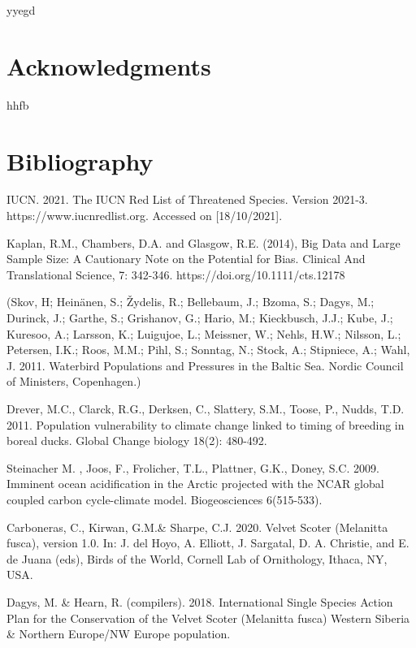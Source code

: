 \documentclass[12pt,a4paper]{article}
\begin{document}
yyegd

\newpage
\section{Acknowledgments}
hhfb




\newpage
\section{Bibliography}
\begin{thebibliography}{999}

IUCN. 2021. The IUCN Red List of Threatened Species. Version 2021-3. https://www.iucnredlist.org. Accessed on [18/10/2021].

Kaplan, R.M., Chambers, D.A. and Glasgow, R.E. (2014), Big Data and Large Sample Size: A Cautionary Note on the Potential for Bias. Clinical And Translational Science, 7: 342-346. https://doi.org/10.1111/cts.12178
 
(Skov, H; Heinänen, S.; Žydelis, R.; Bellebaum, J.; Bzoma, S.; Dagys, M.; Durinck, J.; Garthe, S.; Grishanov, G.; Hario, M.; Kieckbusch, J.J.; Kube, J.; Kuresoo, A.; Larsson, K.; Luigujoe, L.; Meissner, W.; Nehls, H.W.; Nilsson, L.; Petersen, I.K.; Roos, M.M.; Pihl, S.; Sonntag, N.; Stock, A.; Stipniece, A.; Wahl, J. 2011. Waterbird Populations and Pressures in the Baltic Sea. Nordic Council of Ministers, Copenhagen.)

Drever, M.C., Clarck, R.G., Derksen, C., Slattery, S.M., Toose, P., Nudds, T.D. 2011. Population vulnerability to climate change linked to timing of breeding in boreal ducks. Global Change biology 18(2): 480-492.

Steinacher M. , Joos, F., Frolicher, T.L., Plattner, G.K., Doney, S.C. 2009. Imminent ocean acidification in the Arctic projected with the NCAR global coupled carbon cycle-climate model. Biogeosciences 6(515-533).

Carboneras, C., Kirwan, G.M.\& Sharpe, C.J. 2020. Velvet Scoter (Melanitta fusca), version 1.0. In: J. del Hoyo, A. Elliott, J. Sargatal, D. A. Christie, and E. de Juana (eds), Birds of the World, Cornell Lab of Ornithology, Ithaca, NY, USA.

Dagys, M. \& Hearn, R. (compilers). 2018. International Single Species Action Plan for the Conservation of the Velvet Scoter (Melanitta fusca) Western Siberia \& Northern Europe/NW Europe population.


\end{thebibliography}
\end{document}
